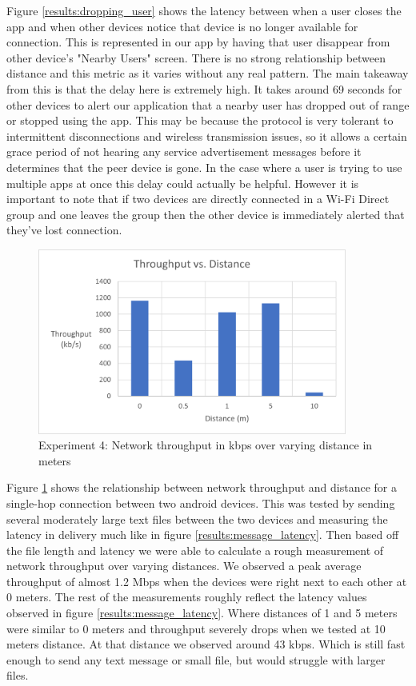 \documentclass[10pt]{article}
\begin{document}
Figure \ref{results:dropping_user} shows the latency between when a user closes the app and when other devices notice that device is no longer available for connection. This is represented in our app by having that user disappear from other device's "Nearby Users" screen. There is no strong relationship between distance and this metric as it varies without any real pattern. The main takeaway from this is that the delay here is extremely high. It takes around 69 seconds for other devices to alert our application that a nearby user has dropped out of range or stopped using the app. This may be because the protocol is very tolerant to intermittent disconnections and wireless transmission issues, so it allows a certain grace period of not hearing any service advertisement messages before it determines that the peer device is gone. In the case where a user is trying to use multiple apps at once this delay could actually be helpful. However it is important to note that if two devices are directly connected in a Wi-Fi Direct group and one leaves the group then the other device is immediately alerted that they've lost connection.

\begin{figure}[h!]
    \centering
    \includegraphics[width=4in]{throughput_graph.png}
    \caption{Experiment 4: Network throughput in kbps over varying distance in meters}
    \label{results:throughput}
\end{figure}

Figure \ref{results:throughput} shows the relationship between network throughput and distance for a single-hop connection between two android devices. This was tested by sending several moderately large text files between the two devices and measuring the latency in delivery much like in figure \ref{results:message_latency}. Then based off the file length and latency we were able to calculate a rough measurement of network throughput over varying distances. We observed a peak average throughput of almost 1.2 Mbps when the devices were right next to each other at 0 meters. The rest of the measurements roughly reflect the latency values observed in figure \ref{results:message_latency}. Where distances of 1 and 5 meters were similar to 0 meters and throughput severely drops when we tested at 10 meters distance. At that distance we observed around 43 kbps. Which is still fast enough to send any text message or small file, but would struggle with larger files. 
\end{document}
